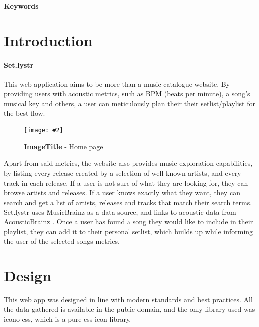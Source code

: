 \documentclass[10pt, a4paper]{article}
\title{\mytitle}
\author{\myauthor\hspace{1em}\\\contact\\Edinburgh Napier University\hspace{0.5em}-\hspace{0.5em}\mymodule}
\date{}
\newcommand{\figuremacro}[5]{
    \begin{figure}[#1]
        \centering
        \texttt{[image: \#2]}
        \caption[#3]{\textbf{#3}#4}
        \label{fig:#2}
    \end{figure}
}
\begin{document}
    \maketitle
    \begin{abstract}
        Set.lystr is a music catalogue exploration/playlist creation tool geared towards musicians who play cover songs. Set.lystr allows its users to search and compare songs and build the ultimate playlist.
    \end{abstract}
    
    \textbf{Keywords -- }{\mykeywords}
    
    \section{Introduction}
    \paragraph{Set.lystr}
    This web application aims to be more than a music catalogue website. By providing users with acoustic metrics, such as BPM (beats per minute), a song's musical key and others, a user can meticulously plan their their setlist/playlist for the best flow.
    
    \figuremacro{h}{index}{ImageTitle}{ - Home page}{1.0}
    
    Apart from said metrics, the website also provides music exploration capabilities, by listing every release created by a selection of well known artists, and every track in each release.
    If a user is not sure of what they are looking for, they can browse artists and releases. If a user knows exactly what they want, they can search and get a list of artists, releases and tracks that match their search terms.
	Set.lystr uses MusicBrainz\cite{musicbrainz} as a data source, and links to acoustic data from AcousticBrainz \cite{acousticbrainz}.
	Once a user has found a song they would like to include in their playlist, they can add it to their personal setlist, which builds up while informing the user of the selected songs metrics.
	
	\section{Design}
	This web app was designed in line with modern standards and best practices. All the data gathered is available in the public domain, and the only library used was icono-css\cite{alipoor}, which is a pure css icon library.
\end{document}
